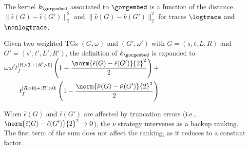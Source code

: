 The kernel $k_{\gorgembed}$ associated to $\gorgembed$ is {a function of the distance  $\|\hat{\epsilon}(G)-\hat{\epsilon}(G')\|_2^2$ and $\|\hat{\nu}(G)-\hat{\nu}(G')\|_2^2$ for traces $\logtrace$ and ${\nonlogtrace}$.}
%

\begin{proposition}
	\label{lem:rewritinglemma}
	Given {two weighted TGs} $(G,\omega)$ and $(G',\omega')$ with $G=(s,t,L,R)$ and $G'=(s',t',L',R')$, the definition of
	$k_\gorgembed$ is expanded to
	$\begin{aligned}
	\omega\omega't_f^{|R>0|+|R'>0|}\left(1-\frac{\norm{\hat{\epsilon}(G)-\hat{\epsilon}(G')}{2}^2}{2}\right)+\\t_f^{|R>0|+|R'>0|}\left(1-\frac{\norm{\hat{\nu}(G)-\hat{\nu}(G')}{2}^2}{2}\right)
	\end{aligned}$
\end{proposition}

When $\hat{\epsilon}(G)$ and $\hat{\epsilon}(G')$ are affected by truncation errors 
(i.e., $\norm{\hat{\epsilon}(G)-\hat{\epsilon}(G')}{2}^2\to 0$), the $\nu$ strategy intervenes as a backup ranking. The first 
term of the sum does not affect the ranking, as it reduces to a constant factor.

%





